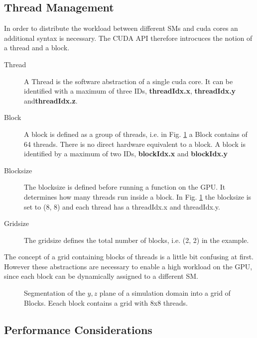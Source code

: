 \clearpage

\subsection{Thread Management}

In order to distribute the workload between different SMs and cuda cores an additional syntax is necessary.
The CUDA API therefore  introcuces the notion of a thread and a block.

\begin{description}
    \item[Thread] A Thread is the software abstraction of a single cuda core. It can be identified with
                   a maximum of three IDs, \textbf{threadIdx.x}, \textbf{threadIdx.y} and\textbf{threadIdx.z}.

    \item[Block] A block is defined as a group of threads, i.e. in Fig. \ref{cuda:grid_example} a Block contains of 64 threads.
                 There  is no direct hardware equivalent to a block.
                 A block is identified by a maximum of two IDs, \textbf{blockIdx.x} and \textbf{blockIdx.y}

    \item[Blocksize] The blocksize is defined before running a function on the GPU. It determines how
                    many threads run inside a block. In Fig. \ref{cuda:grid_example} the blocksize is set to (8, 8) and
                    each thread has a threadIdx.x and threadIdx.y.

    \item[Gridsize] The gridsize defines the total number of blocks, i.e. (2, 2) in the example.
\end{description}

The concept of a grid containing blocks of threads is a little bit confusing at first.
However these abstractions are necessary to enable a high workload on the GPU,
since each block can be dynamically assigned to a different SM.


\begin{figure}[!bp]
      \centering
       \caption{Segmentation of the $y, z$ plane of a simulation domain into a grid of Blocks.
                 Eeach block contains a grid with 8x8 threads.}
       \label{cuda:grid_example}
\end{figure}

\subsection{Performance Considerations}

